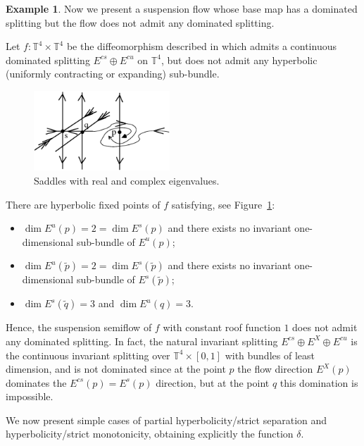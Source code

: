\documentclass[12pt,reqno]{amsart}
\numberwithin{equation}{section}
\theoremstyle{plain}
\theoremstyle{definition}
\newtheorem{example}{Example}
\newcommand{\TT}{{\mathbb T}}
\begin{document}
\begin{example}
  \label{ex:no-domination}
  Now we present a suspension flow whose base map has a
  dominated splitting but the flow does not admit any
  dominated splitting.

  Let $f:\TT^4\times\TT^4$ be the diffeomorphism described
  in \cite{BoV00} which admits a continuous dominated
  splitting $E^{cs}\oplus E^{cu}$ on $\TT^4$, but does not
  admit any hyperbolic (uniformly contracting or expanding)
  sub-bundle.
  \begin{figure}[htpb]
    \includegraphics[height=3cm]{nonhypcomplex}
    \caption{Saddles with real and complex eigenvalues.}
    \label{fig:nonhypcomplex}
  \end{figure}
  There are hyperbolic fixed points of $f$ satisfying, see
  Figure~\ref{fig:nonhypcomplex}:
  \begin{itemize}
  \item $\dim E^u(p)=2=\dim E^s(p)$ and there exists no
    invariant one-dimensional sub-bundle of $E^u(p)$;
  \item $\dim E^u(\widetilde p)=2=\dim E^s(\widetilde p)$ and there exists no
    invariant one-dimensional sub-bundle of $E^s(\widetilde
    p)$;
  \item $\dim E^s(\widetilde q)=3$ and $\dim E^u(q)=3$.
  \end{itemize}
  Hence, the suspension semiflow of $f$ with constant roof
  function $1$ does not admit any dominated splitting. In
  fact, the natural invariant splitting $E^{cs}\oplus
  E^X\oplus E^{cu}$ is the continuous invariant splitting
  over $\TT^4\times [0,1]$ with bundles of least dimension,
  and is not dominated since at the point $p$ the flow
  direction $E^X(p)$ dominates the $E^{cs}(p)=E^s(p)$
  direction, but at the point $q$ this domination is
  impossible.
\end{example}

We now present simple cases of partial hyperbolicity/strict
separation and hyperbolicity/strict monotonicity,
obtaining explicitly the function $\delta$.
\end{document}
